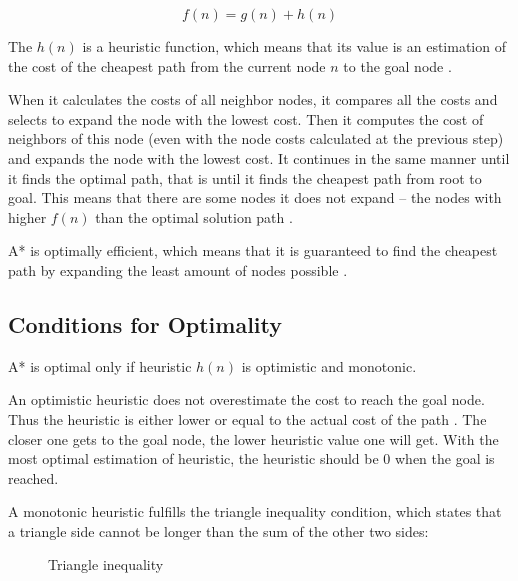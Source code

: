 \documentclass[a4paper]{article}
\begin{document}
\begin{equation}
f(n) = g(n) + h(n)
\end{equation}

The $h(n)$ is a heuristic function, which means that its value is an estimation of the cost of the cheapest path from the current node $n$ to the goal node \citep{russell2009artificial}.

When it calculates the costs of all neighbor nodes, it compares all the costs and selects to expand the node with the lowest cost. Then it computes the cost of neighbors of this node (even with the node costs calculated at the previous step) and expands the node with the lowest cost. It continues in the same manner until it finds the optimal path, that is until it finds the cheapest path from root to goal. This means that there are some nodes it does not expand -- the nodes with higher $f(n)$ than the optimal solution path \citep{russell2009artificial}.

A* is optimally efficient, which means that it is guaranteed to find the cheapest path by expanding the least amount of nodes possible \citep{russell2009artificial}.

\subsection{Conditions for Optimality}
A* is optimal only if heuristic $h(n)$ is optimistic and monotonic. 

An optimistic heuristic does not overestimate the cost to reach the goal node. Thus the heuristic is either lower or equal to the actual cost of the path \citep{russell2009artificial}. The closer one gets to the goal node, the lower heuristic value one will get. With the most optimal estimation of heuristic, the heuristic should be 0 when the goal is reached.

A monotonic heuristic fulfills the triangle inequality condition, which states that a triangle side cannot be longer than the sum of the other two sides:

\newpage

\begin{figure}[H]
\begin{center}
\end{center}
\caption{Triangle inequality}
\end{figure}
\end{document}
